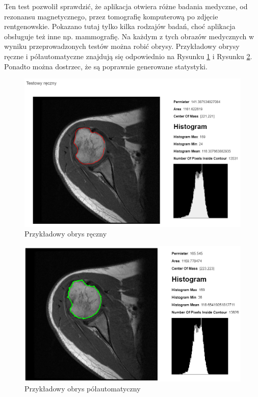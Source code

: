 \documentclass[a4paper,11pt,twoside,openright]{report}
\theoremstyle{definition}
\begin{document}
Ten test pozwolił sprawdzić, że aplikacja otwiera różne badania medyczne, od rezonansu magnetycznego, przez tomografię komputerową po zdjęcie rentgenowskie. Pokazano tutaj tylko kilka rodzajów badań, choć aplikacja obsługuje też inne np. mammografię. Na każdym z tych obrazów medycznych w wyniku przeprowadzonych testów można robić obrysy. Przykładowy obrysy ręczne i półautomatyczne znajdują się odpowiednio na Rysunku \ref{fig:105} i Rysunku \ref{fig:107}. Ponadto można dostrzec, że są poprawnie generowane statystyki.

\begin{figure}[p]
	\center
	\includegraphics[width=1\textwidth]{105}
	\caption{Przykładowy obrys ręczny}
    	\label{fig:105}
\end{figure}

\begin{figure}[p]
	\center
	\includegraphics[width=1\textwidth]{107}
	\caption{Przykładowy obrys półautomatyczny}
    	\label{fig:107}
\end{figure}
\end{document}
